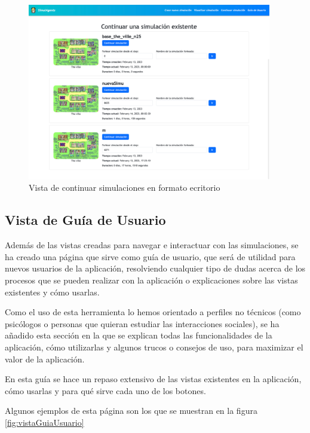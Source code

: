  \begin{figure}[H]
 	\centering
 	\includegraphics[width = 0.95\textwidth]{Imagenes/Vectorial/vistaContSimu.png}
 	\caption{Vista de continuar simulaciones en formato ecritorio}
 	\label{fig:contSimDesktop}
 \end{figure}

\subsection{Vista de Guía de Usuario}

Además de las vistas creadas para navegar e interactuar con las simulaciones, se ha creado una página que sirve como guía de usuario, que será de utilidad para nuevos usuarios de la aplicación, resolviendo cualquier tipo de dudas acerca de los procesos que se pueden realizar con la aplicación o explicaciones sobre las vistas existentes y cómo usarlas.

Como el uso de esta herramienta lo hemos orientado a perfiles no técnicos (como psicólogos o personas que quieran estudiar las interacciones sociales), se ha añadido esta sección en la que se explican todas las funcionalidades de la aplicación, cómo utilizarlas y algunos trucos o consejos de uso, para maximizar el valor de la aplicación.

En esta guía se hace un repaso extensivo de las vistas existentes en la aplicación, cómo usarlas y para qué sirve cada uno de los botones.

Algunos ejemplos de esta página son los que se muestran en la figura \ref{fig:vistaGuiaUsuario}

